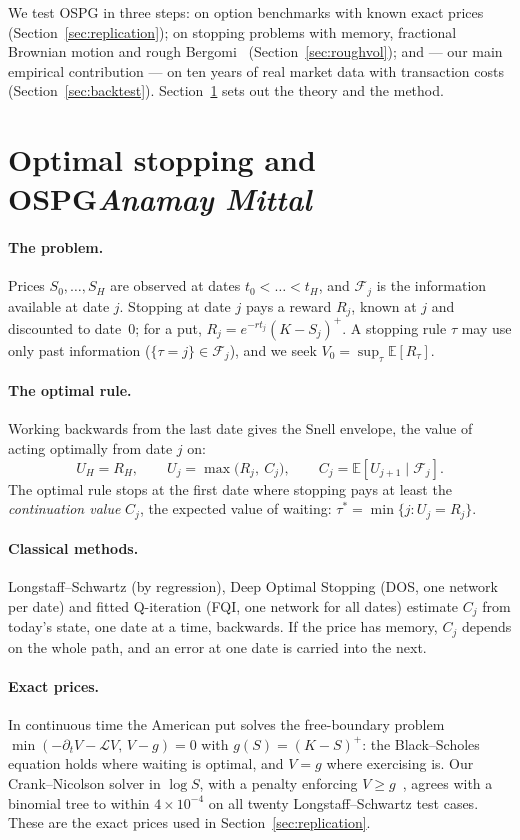 \documentclass[11pt,a4paper]{article}
\newcommand{\by}[1]{\hfill{\normalfont\normalsize\itshape #1}}
\begin{document}
We test OSPG in three steps: on option benchmarks with known exact prices
(Section~\ref{sec:replication}); on stopping problems with memory, fractional Brownian motion
and rough Bergomi~\cite{bfg2016} (Section~\ref{sec:roughvol}); and --- our main empirical
contribution --- on ten years of real market data with transaction costs
(Section~\ref{sec:backtest}). Section~\ref{sec:method} sets out the theory and the method.

\section[Optimal stopping and OSPG]{Optimal stopping and OSPG\by{Anamay Mittal}}
\label{sec:method}
\paragraph{The problem.} Prices $S_0,\dots,S_H$ are observed at dates $t_0<\dots<t_H$, and
$\mathcal F_j$ is the information available at date $j$. Stopping at date $j$ pays a reward
$R_j$, known at $j$ and discounted to date~0; for a put, $R_j=e^{-rt_j}(K-S_j)^+$. A stopping
rule $\tau$ may use only past information ($\{\tau=j\}\in\mathcal F_j$), and we seek
$V_0=\sup_\tau\mathbb E[R_\tau]$.

\paragraph{The optimal rule.} Working backwards from the last date gives the Snell envelope,
the value of acting optimally from date $j$ on:
\[U_H=R_H,\qquad U_j=\max\big(R_j,\ C_j\big),\qquad C_j=\mathbb E[U_{j+1}\mid\mathcal F_j].\]
The optimal rule stops at the first date where stopping pays at least the
\emph{continuation value} $C_j$, the expected value of waiting: $\tau^*=\min\{j:U_j=R_j\}$.

\paragraph{Classical methods.} Longstaff--Schwartz (by regression), Deep Optimal Stopping (DOS,
one network per date) and fitted Q-iteration (FQI, one network for all dates) estimate $C_j$
from today's state, one date at a time, backwards. If the price has memory, $C_j$ depends on
the whole path, and an error at one date is carried into the next.

\paragraph{Exact prices.} In continuous time the American put solves the free-boundary problem
$\min(-\partial_tV-\mathcal LV,\,V-g)=0$ with $g(S)=(K-S)^+$: the Black--Scholes equation holds
where waiting is optimal, and $V=g$ where exercising is. Our Crank--Nicolson solver in $\log S$,
with a penalty enforcing $V\ge g$~\cite{forsyth2002}, agrees with a binomial tree to within
$4\times10^{-4}$ on all twenty Longstaff--Schwartz test cases. These are the exact prices used
in Section~\ref{sec:replication}.
\end{document}
